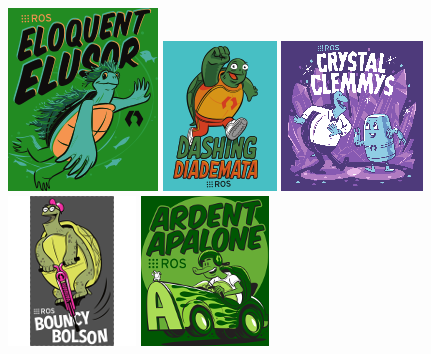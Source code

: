 \documentclass[%
xelatex,
	oneside,		%
	12pt,			%
	parskip=half,	%
	abstracton,
	chapterprefix=true%
    appendixprefix=true]
{scrbook}
\begin{document}
 \includegraphics[scale=.112]{fig/eloquent-small.png} \hspace*{1cm}
\includegraphics[scale=.09]{fig/dashing-small.png}\hspace*{1cm}
\includegraphics[scale=.48]{fig/crystal-small.png}\hspace*{1cm}
\includegraphics[scale=1]{fig/bouncy-small.png}\hspace*{1cm}
\includegraphics[scale=2]{fig/ardent-small.png}
\end{document}
